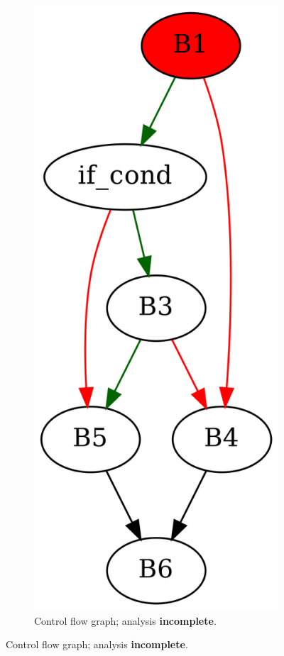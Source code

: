 \documentclass[aspectratio=1610]{beamer}
\begin{document}
\begin{frame}[noframenumbering]
\begin{figure}[htbp]
\begin{subfigure}[b]{0.50\textwidth}
			\includegraphics[height=0.5\paperheight]{inc/methods/interval/counter-example/bool_propagation_jump/f_0002b.png}
			\caption{Control flow graph; analysis \textbf{incomplete}.}
		\end{subfigure}
	\end{figure}
\end{frame}
\end{document}
